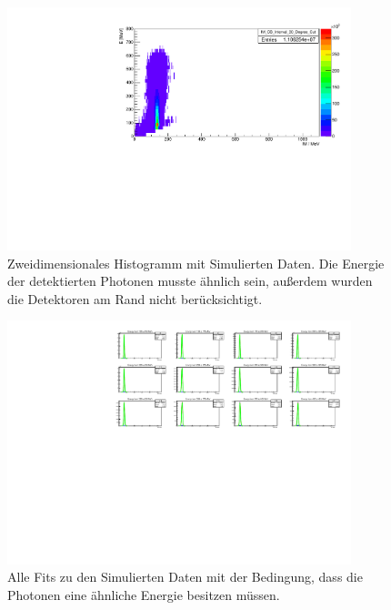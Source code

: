 \documentclass[a4paper,11pt,oneside,final,german,openbib,pdftex]{scrbook}
\begin{document}
{\begin{appendix}
\begin{figure}[h!]
	\begin{center}
		\includegraphics[width=100mm]{NewCalib/20171904Sim30DegreeCut}
		\caption{Zweidimensionales Histogramm mit Simulierten Daten. Die Energie der detektierten Photonen musste \"ahnlich sein, au{\ss}erdem wurden die Detektoren am Rand nicht ber\"ucksichtigt.}
		\label{fig:Sim-Data-2DHist-30-Degree-Edge}
	\end{center}
\end{figure}


\begin{figure}[h!]
	\begin{center}
		\includegraphics[width=100mm]{NewCalib/20171904SimNoCutAllFits}
		\caption{Alle Fits zu den Simulierten Daten mit der Bedingung, dass die Photonen eine \"ahnliche Energie besitzen m\"ussen.}
		\label{fig:Sim-No-Cut-All-Fits}
	\end{center}
\end{figure}



\end{appendix}}
\end{document}
